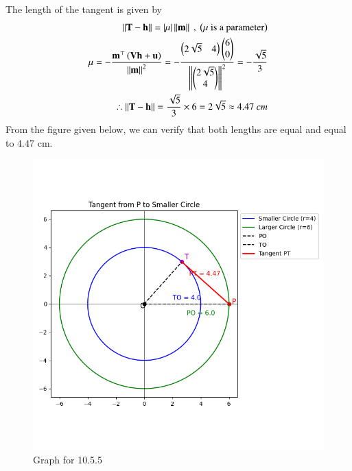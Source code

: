 \documentclass[journal,12pt,onecolumn]{IEEEtran}
\theoremstyle{remark}
\begin{document}
The length of the tangent is given by
\begin{align}
    \norm{\vec{T}-\vec{h}}=\abs{\mu} \norm{\vec{m}} \ , \ \brak{\text{$\mu$ is a parameter}}\\
    \mu= -\dfrac{\vec{m}^{\top} \brak{\vec{V}\vec{h} + \vec{u}}}{\norm{\vec{m}}^2} =-\dfrac{\myvec{2\sqrt{5} & 4} \myvec{6\\0}}{\norm{\myvec{2\sqrt{5} \\ 4}}^2}=-\dfrac{\sqrt{5}}{3}\\
    \therefore \norm{\vec{T}-\vec{h}}=\dfrac{\sqrt{5}}{3} \times 6 = 2\sqrt{5} \approx 4.47 \ cm
\end{align}
From the figure given below, we can verify that both lengths are equal and equal to $4.47$ cm.
\begin{figure}
    \centering
    \includegraphics[width=1\columnwidth]{figs/1.png}
    \caption{Graph for 10.5.5}
    \label{fig:placeholder}
\end{figure}
\end{document}
